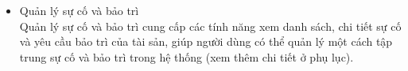 \begin{itemize}
\item{Quản lý sự cố và bảo trì}\\
Quản lý sự cố và bảo trì cung cấp các tính năng xem danh sách, chi tiết sự cố và yêu cầu bảo trì của tài sản, giúp người dùng có thể quản lý một cách tập trung sự cố và bảo trì trong hệ thống (xem thêm chi tiết ở phụ lục).


\end{itemize}

